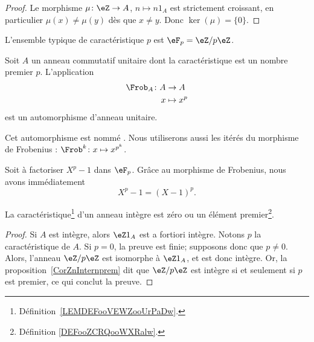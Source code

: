 \begin{proof}
	Le morphisme \( \mu\colon \eZ\to A\), \( n\mapsto n 1_A\) est strictement croissant, en particulier \( \mu(x)\neq \mu(y)\) dès que \( x\neq y\). Donc \( \ker(\mu)=\{ 0 \}\).
\end{proof}

L'ensemble typique de caractéristique \( p\) est \( \eF_p=\eZ/p\eZ\).

\begin{proposition} \label{PropFrobHAMkTY}
	Soit \( A\) un anneau commutatif unitaire dont la caractéristique est un nombre premier \( p\). L'application
	\begin{equation}
		\begin{aligned}
			\Frob_A\colon A & \to A       \\
			x               & \mapsto x^p
		\end{aligned}
	\end{equation}
	est un automorphisme d'anneau unitaire.

	Cet automorphisme est nommé . Nous utiliserons aussi les itérés du morphisme de Frobenius : \( \Frob^k\colon x\mapsto x^{p^k}\).
\end{proposition}

\begin{example}
	Soit à factoriser \( X^p-1\) dans \( \eF_p\). Grâce au morphisme de Frobenius, nous avons immédiatement
	\begin{equation}
		X^p-1=(X-1)^p.
	\end{equation}
\end{example}


\begin{lemma}       \label{LemCaractIntergernbrcartpre}
	La caractéristique\footnote{Définition~\ref{LEMDEFooVEWZooUrPaDw}.} d'un anneau intègre est zéro ou un élément premier\footnote{Définition \ref{DEFooZCRQooWXRalw}.}.
\end{lemma}

\begin{proof}
	Si \( A\) est intègre, alors \( \eZ 1_A\) est a fortiori intègre. Notons \( p \) la caractéristique de \( A \). Si \( p = 0 \), la preuve est finie; supposons donc que \( p \neq 0 \). Alors, l'anneau \( \eZ/p\eZ\) est isomorphe à \( \eZ 1_A\), et est donc intègre. Or, la proposition~\ref{CorZnInternprem} dit que \( \eZ/p\eZ\) est intègre si et seulement si \( p\) est premier, ce qui conclut la preuve.
\end{proof}

